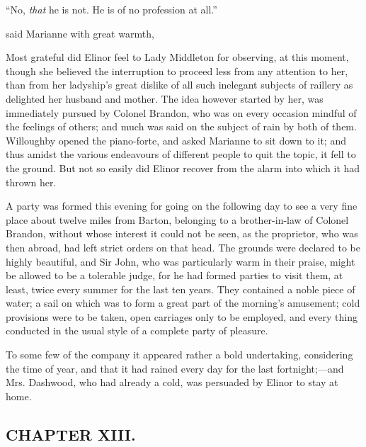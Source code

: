 
“No, {\em that} he is not. He is of no profession at all.”

 said Marianne with great warmth, 


Most grateful did Elinor feel to Lady Middleton for observing, at this moment,  though she believed the interruption to proceed less from any attention to her, than from her ladyship's great dislike of all such inelegant subjects of raillery as delighted her husband and mother. The idea however started by her, was immediately pursued by Colonel Brandon, who was on every occasion mindful of the feelings of others; and much was said on the subject of rain by both of them. Willoughby opened the piano-forte, and asked Marianne to sit down to it; and thus amidst the various endeavours of different people to quit the topic, it fell to the ground. But not so easily did Elinor recover from the alarm into which it had thrown her.

A party was formed this evening for going on the following day to see a very fine place about twelve miles from Barton, belonging to a brother-in-law of Colonel Brandon, without whose interest it could not be seen, as the proprietor, who was then abroad, had left strict orders on that head. The grounds were declared to be highly beautiful, and Sir John, who was particularly warm in their praise, might be allowed to be a tolerable judge, for he had formed parties to visit them, at least, twice every summer for the last ten years. They contained a noble piece of water; a sail on which was to form a great part of the morning's amusement; cold provisions were to be taken, open carriages only to be employed, and every thing conducted in the usual style of a complete party of pleasure.

To some few of the company it appeared rather a bold undertaking, considering the time of year, and that it had rained every day for the last fortnight;---and Mrs. Dashwood, who had already a cold, was persuaded by Elinor to stay at home.

\subsection[chapter-xiii.]{\useURL[url13][][][]\from[url13]CHAPTER XIII.}

